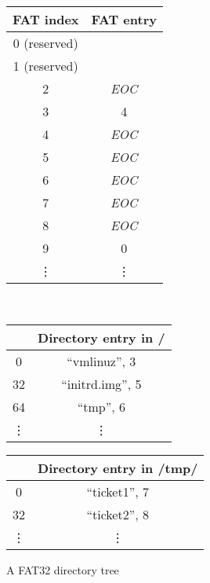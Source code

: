 \documentclass[submission,copyright,creativecommons]{eptcs}
\begin{document}
\begin{figure}
  \centering
  \caption{A FAT32 directory tree}
  \label{fat32-example}

  \begin{tabular}{|c|c|}
    \hline
    FAT index & FAT entry \\ \hline
    0 (reserved) &  \\ \hline
    1 (reserved) &  \\ \hline
    2 & \textit{EOC} \\ \hline
    3 & 4 \\ \hline
    4 & \textit{EOC} \\ \hline
    5 & \textit{EOC} \\ \hline
    6 & \textit{EOC} \\ \hline
    7 & \textit{EOC} \\ \hline
    8 & \textit{EOC} \\ \hline
    9 & 0 \\ \hline
    \vdots & \vdots
  \end{tabular}\\

  \begin{tabular}{|c|c|}
    \hline
       & Directory entry in / \\ \hline
    0  & ``vmlinuz'', 3 \\ \hline
    32 & ``initrd.img'', 5 \\ \hline
    64 & ``tmp'', 6 \\ \hline
    \vdots & \vdots
  \end{tabular}

  \begin{tabular}{|c|c|}
    \hline
       & Directory entry in /tmp/ \\ \hline
    0  & ``ticket1'', 7 \\ \hline
    32 & ``ticket2'', 8 \\ \hline
    \vdots & \vdots
  \end{tabular}
\end{figure}

\end{document}

